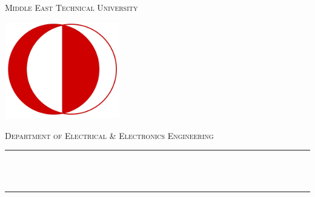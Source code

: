 \begin{titlepage}

\newcommand{\HRule}{\rule{\linewidth}{0.5mm}} %



\begin{minipage}{0.65\textwidth}
\center
\textsc{\huge Middle East Technical University}

\end{minipage} \hfill
\begin{minipage}{0.3\textwidth}
\includegraphics[width = 5cm]{document/figures/odtu_logo.png}
\end{minipage}

\center %

\textsc{\LARGE Department of \newline Electrical \& Electronics Engineering}


\vspace{3.4cm}

\HRule \\[0.4cm]
{ \huge \bfseries \reporttitle}\\ %
\HRule \\[1.5cm]

\vspace{2.6cm}
 


\end{titlepage}
